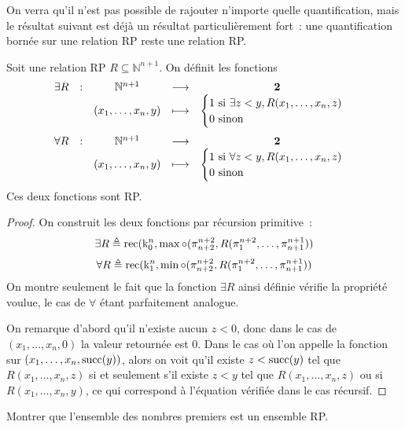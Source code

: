 On verra qu'il n'est pas possible de rajouter n'importe quelle quantification,
mais le résultat suivant est déjà un résultat particulièrement fort~: une
quantification bornée sur une relation RP reste une relation RP.

\begin{proposition}
  Soit une relation RP $R\subseteq \mathbb N^{n+1}$. On définit les fonctions
  \[\begin{array}{ccccc}
  \exists R&:&\mathbb N^{n+1} & \longrightarrow & \boldsymbol{2}\\
  & & (x_1,\ldots,x_n,y) &\longmapsto &
  \begin{cases}
    1 \text{ si } \exists z < y, R(x_1,\ldots,x_n,z)\\
    0 \text{ sinon }
  \end{cases}
  \end{array}\]
  \[\begin{array}{ccccc}
  \forall R & : & \mathbb N^{n+1} & \longrightarrow & \boldsymbol{2}\\
  & & (x_1,\ldots,x_n,y) &\longmapsto &
  \begin{cases}
    1 \text{ si } \forall z < y, R(x_1,\ldots,x_n,z)\\
    0 \text{ sinon }
  \end{cases}
  \end{array}\]
  Ces deux fonctions sont RP.
\end{proposition}

\begin{proof}
  On construit les deux fonctions par récursion primitive~:
  \[\exists R \triangleq \operatorname{rec}(\mathrm k_0^n,\max\circ
  (\pi_{n+2}^{n+2},R(\pi_1^{n+2},\ldots,\pi_{n+1}^{n+1}))\]
  \[\forall R \triangleq \operatorname{rec}(\mathrm k_1^n,\min\circ
  (\pi_{n+2}^{n+2},R(\pi_1^{n+2},\ldots,\pi_{n+1}^{n+1}))\]
  On montre seulement le fait que la fonction $\exists R$ ainsi définie
  vérifie la propriété voulue, le cas de $\forall$ étant parfaitement analogue.

  On remarque d'abord qu'il n'existe aucun $z < 0$, donc dans le cas de
  $(x_1,\ldots,x_n,0)$ la valeur retournée est $0$. Dans le cas où l'on appelle
  la fonction sur $(x_1,\ldots,x_n,\operatorname{succ}(y))$, alors on voit qu'il existe
  $z < \operatorname{succ} (y)$ tel que $R(x_1,\ldots,x_n,z)$ si et seulement s'il existe
  $z < y$ tel que $R(x_1,\ldots,x_n,z)$ ou si $R(x_1,\ldots,x_n,y)$, ce qui
  correspond à l'équation vérifiée dans le cas récursif.
\end{proof}

\begin{exercise}
  Montrer que l'ensemble des nombres premiers est un ensemble RP.
\end{exercise}

